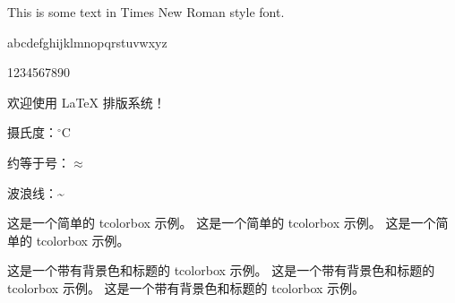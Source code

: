 \documentclass{ctexart}
\begin{document}
This is some text in Times New Roman style font.

abcdefghijklmnopqrstuvwxyz

1234567890

欢迎使用 \LaTeX{} 排版系统！


摄氏度：$^\circ$C

约等于号：$\approx$

波浪线：\~{}

\begin{tcolorbox}
    \indent 这是一个简单的 tcolorbox 示例。
    这是一个简单的 tcolorbox 示例。
    这是一个简单的 tcolorbox 示例。
\end{tcolorbox}

\begin{tcolorbox}[colback=blue!5!white,colframe=blue!75!black,title=My box]
    \qquad 这是一个带有背景色和标题的 tcolorbox 示例。
    这是一个带有背景色和标题的 tcolorbox 示例。
    这是一个带有背景色和标题的 tcolorbox 示例。
\end{tcolorbox}

\begin{tcolorbox}[before upper={\parindent1em}]
    \lipsum[1]
\end{tcolorbox}
\end{document}
